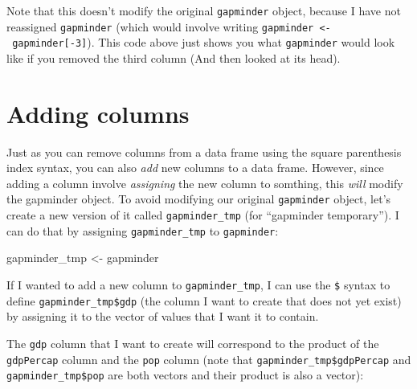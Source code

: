 \documentclass[
  letterpaper,
  DIV=11,
  numbers=noendperiod]{scrreprt}
\newenvironment{Shaded}{\begin{snugshade}}{\end{snugshade}}
\newcommand{\NormalTok}[1]{\textcolor[rgb]{0.00,0.23,0.31}{#1}}
\newcommand{\OtherTok}[1]{\textcolor[rgb]{0.00,0.23,0.31}{#1}}
\newcommand{\SpecialCharTok}[1]{\textcolor[rgb]{0.37,0.37,0.37}{#1}}
\begin{document}
Note that this doesn't modify the original \texttt{gapminder} object,
because I have not reassigned \texttt{gapminder} (which would involve
writing \texttt{gapminder\ \textless{}-\ gapminder{[}-3{]}}). This code
above just shows you what \texttt{gapminder} would look like if you
removed the third column (And then looked at its head).

\section{Adding columns}\label{adding-columns}

Just as you can remove columns from a data frame using the square
parenthesis index syntax, you can also \emph{add} new columns to a data
frame. However, since adding a column involve \emph{assigning} the new
column to somthing, this \emph{will} modify the gapminder object. To
avoid modifying our original \texttt{gapminder} object, let's create a
new version of it called \texttt{gapminder\_tmp} (for ``gapminder
temporary''). I can do that by assigning \texttt{gapminder\_tmp} to
\texttt{gapminder}:

\begin{Shaded}
\begin{Highlighting}[]
\NormalTok{gapminder\_tmp }\OtherTok{\textless{}{-}}\NormalTok{ gapminder}
\end{Highlighting}
\end{Shaded}

If I wanted to add a new column to \texttt{gapminder\_tmp}, I can use
the \texttt{\$} syntax to define \texttt{gapminder\_tmp\$gdp} (the
column I want to create that does not yet exist) by assigning it to the
vector of values that I want it to contain.

The \texttt{gdp} column that I want to create will correspond to the
product of the \texttt{gdpPercap} column and the \texttt{pop} column
(note that \texttt{gapminder\_tmp\$gdpPercap} and
\texttt{gapminder\_tmp\$pop} are both vectors and their product is also
a vector):

\begin{Shaded}
\end{Shaded}
\end{document}
